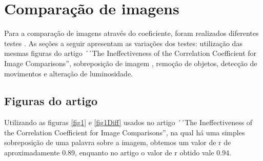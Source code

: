\documentclass[10pt,a4paper]{article}
\begin{document}

\newpage
\section{Comparação de imagens}

Para a comparação de imagens através do coeficiente, foram realizados diferentes testes
. As seções a seguir apresentam as variações dos testes: utilização
das mesmas figuras do artigo ´´The Ineffectiveness of the Correlation
Coefficient for Image Comparisons'', sobreposição de imagem , remoção de objetos, detecção
de movimentos e alteração de luminosidade.  

\subsection{Figuras do artigo }
Utilizando as figuras \ref{fig1} e \ref{fig1Diff} usados no artigo ´´The Ineffectiveness of the Correlation
Coefficient for Image Comparisons'', na qual há uma simples
sobreposição de uma palavra sobre a imagem, obtemos um valor de r de
aproximadamente 0.89, enquanto no artigo o valor de r obtido vale 0.94.
\end{document}
